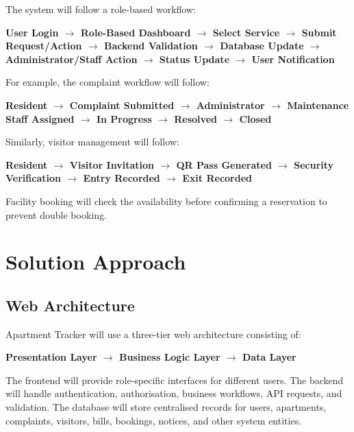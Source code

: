 \documentclass[11pt,a4paper]{article}
\begin{document}
The system will follow a role-based workflow:

\begin{center}
\textbf{
User Login $\rightarrow$ Role-Based Dashboard $\rightarrow$ Select Service $\rightarrow$ Submit Request/Action $\rightarrow$ Backend Validation $\rightarrow$ Database Update $\rightarrow$ Administrator/Staff Action $\rightarrow$ Status Update $\rightarrow$ User Notification
}
\end{center}

For example, the complaint workflow will follow:

\begin{center}
\textbf{
Resident $\rightarrow$ Complaint Submitted $\rightarrow$ Administrator $\rightarrow$ Maintenance Staff Assigned $\rightarrow$ In Progress $\rightarrow$ Resolved $\rightarrow$ Closed
}
\end{center}

Similarly, visitor management will follow:

\begin{center}
\textbf{
Resident $\rightarrow$ Visitor Invitation $\rightarrow$ QR Pass Generated $\rightarrow$ Security Verification $\rightarrow$ Entry Recorded $\rightarrow$ Exit Recorded
}
\end{center}

Facility booking will check the availability before confirming a reservation to prevent double booking.


\section{Solution Approach}

\subsection{Web Architecture}

Apartment Tracker will use a three-tier web architecture consisting of:

\begin{center}
\textbf{
Presentation Layer $\rightarrow$ Business Logic Layer $\rightarrow$ Data Layer
}
\end{center}

The frontend will provide role-specific interfaces for different users. The backend will handle authentication, authorisation, business workflows, API requests, and validation. The database will store centralised records for users, apartments, complaints, visitors, bills, bookings, notices, and other system entities.
\end{document}
